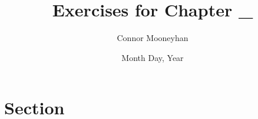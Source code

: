 \documentclass[12pt]{article}
\title{Exercises for Chapter _}
\author{Connor Mooneyhan}
\date{Month Day, Year}
\theoremstyle{definition}
\begin{document}
\maketitle

\section{Section}
\end{document}
